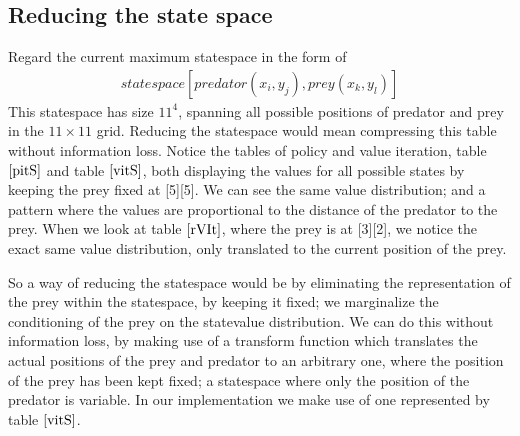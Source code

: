 \documentclass[paper=a4, fontsize=11pt]{scrartcl}
\numberwithin{equation}{section}		%
\numberwithin{figure}{section}			%
\numberwithin{table}{section}				%
\begin{document}
\subsection{Reducing the state space}
\label{reduce}
Regard the current maximum statespace in the form of 
\begin{align}
statespace[predator(x_i,y_j), prey(x_k,y_l)]
\end{align}
This statespace has size $11^4$, spanning all possible positions of predator and prey in the $11 \times 11$ grid. Reducing the statespace would mean compressing this table without information loss. Notice the tables of policy and value iteration, table $\ref{pitS}$ and table $\ref{vitS}$, both displaying the values for all possible states by keeping the prey fixed at [5][5]. We can see the same value distribution; and a pattern where the values are proportional to the distance of the predator to the prey. When we look at table $\ref{rVIt}$, where the prey is at [3][2], we notice the exact same value distribution, only translated to the current position of the prey. 

\indent So a way of reducing the statespace would be by eliminating the representation of the prey within the statespace, by keeping it fixed; we marginalize the conditioning of the prey on the statevalue distribution. We can do this without information loss, by making use of a transform function which translates the actual positions of the prey and predator to an arbitrary one, where the position of the prey has been kept fixed; a statespace where only the position of the predator is variable. In our implementation we make use of one represented by table $\ref{vitS}$.
\end{document}
